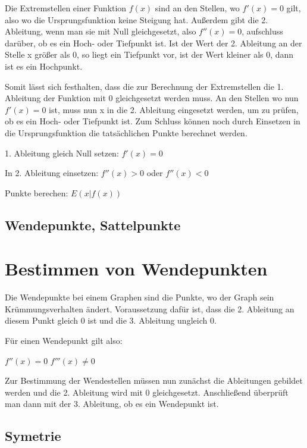 Die Extremstellen einer Funktion $f(x)$ sind an den Stellen, wo $f'(x) = 0$ gilt, also wo
die Ursprungsfunktion keine Steigung hat. Außerdem gibt die 2. Ableitung, wenn man sie mit Null
gleichgesetzt, also $f''(x) = 0$, aufschluss darüber, ob es ein Hoch- oder Tiefpunkt ist.
Ist der Wert der 2. Ableitung an der Stelle x größer als $0$, so liegt ein Tiefpunkt vor, ist der Wert kleiner
als $0$, dann ist es ein Hochpunkt.
\newline

Somit lässt sich festhalten, dass die zur Berechnung der Extremstellen die 1. Ableitung der Funktion
mit $0$ gleichgesetzt werden muss. An den Stellen wo nun $f'(x) = 0$ ist, muss nun x in die 2. Ableitung
eingesetzt werden, um zu prüfen, ob es ein Hoch- oder Tiefpunkt ist.
Zum Schluss können noch durch Einsetzen in die Ursprungsfunktion die tatsächlichen Punkte
berechnet werden.
\newline

1. Ableitung gleich Null setzen: $f'(x) = 0$

In 2. Ableitung einsetzen: $f''(x) > 0$ oder $f''(x) < 0$

Punkte berechen: $E( x | f(x) )$

\subsection{Wendepunkte, Sattelpunkte}

\section*{Bestimmen von Wendepunkten}
Die Wendepunkte bei einem Graphen sind die Punkte, wo der Graph sein Krümmungsverhalten ändert.
Voraussetzung dafür ist, dass die 2. Ableitung an diesem Punkt gleich $0$ ist und die 3. Ableitung ungleich $0$.
\newline

Für einen Wendepunkt gilt also:

$f''(x) = 0$
$f'''(x) \neq 0$
\newline

Zur Bestimmung der Wendestellen müssen nun zunächst die Ableitungen gebildet werden und
die 2. Ableitung wird mit 0 gleichgesetzt. Anschließend überprüft man dann mit der 3. Ableitung,
ob es ein Wendepunkt ist.

\subsection{Symetrie}

